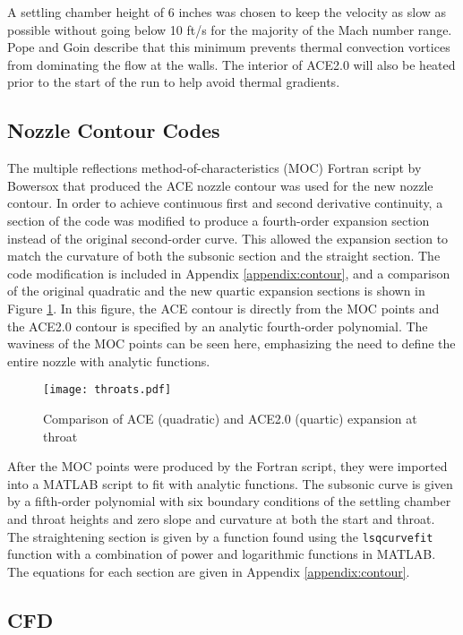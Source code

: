 A settling chamber height of 6 inches was chosen to keep the velocity as slow as possible without going below 10 ft/s for the majority of the Mach number range. Pope and Goin \cite{pope} describe that this minimum prevents thermal convection vortices from dominating the flow at the walls. The interior of ACE2.0 will also be heated prior to the start of the run to help avoid thermal gradients. 

\subsection{Nozzle Contour Codes}

The multiple reflections method-of-characteristics (MOC) Fortran script by Bowersox that produced the ACE nozzle contour was used for the new nozzle contour. In order to achieve continuous first and second derivative continuity, a section of the code was modified to produce a fourth-order expansion section instead of the original second-order curve. This allowed the expansion section to match the curvature of both the subsonic section and the straight section. The code modification is included in Appendix \ref{appendix:contour}, and a comparison of the original quadratic and the new quartic expansion sections is shown in Figure \ref{fig:throats}. In this figure, the ACE contour is directly from the MOC points and the ACE2.0 contour is specified by an analytic fourth-order polynomial. The waviness of the MOC points can be seen here, emphasizing the need to define the entire nozzle with analytic functions.

\begin{figure}[ht!]
    \centering
    \texttt{[image: throats.pdf]}
    \caption{Comparison of ACE (quadratic) and ACE2.0 (quartic) expansion at throat}
    \label{fig:throats}
\end{figure}

After the MOC points were produced by the Fortran script, they were imported into a MATLAB script to fit with analytic functions. The subsonic curve is given by a fifth-order polynomial with six boundary conditions of the settling chamber and throat heights and zero slope and curvature at both the start and throat. The straightening section is given by a function found using the \texttt{lsqcurvefit} function with a combination of power and logarithmic functions in MATLAB. The equations for each section are given in Appendix \ref{appendix:contour}.

\subsection{CFD}

